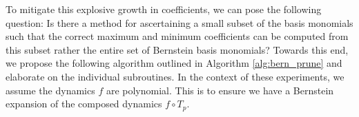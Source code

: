 To mitigate this explosive growth in coefficients, we can pose the following question: Is there a method for ascertaining a small subset of the basis monomials such that the correct maximum and minimum coefficients can be computed from this subset rather the entire set of Bernstein basis monomials?
%
Towards this end, we propose the following algorithm outlined in Algorithm \ref{alg:bern_prune} and elaborate on the individual subroutines. In the context of these experiments, we assume the dynamics $f$ are polynomial. This is to ensure we have a Bernstein expansion of the composed dynamics $f \circ T_p$.



\newcommand\litem[1]{\item{\bfseries #1 \\}}

